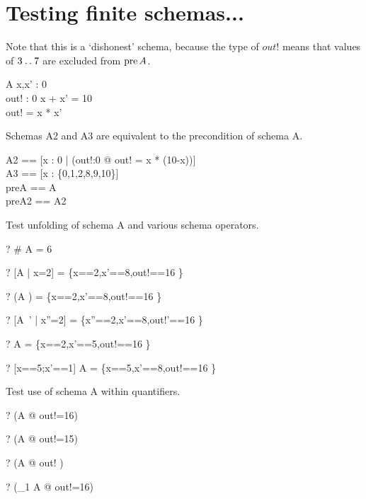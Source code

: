\documentclass{article}
\begin{document}
\section{Testing finite schemas...}

Note that this is a `dishonest' schema, because the type of $out!$
means that values of $3 \mathbin{\mathstrut{\ldotp\ldotp}} 7$ are excluded from $\mathop{\mathstrut{\mbox{\textrm{pre}}}}\nolimits A$.
\begin{schema}{A}
  x,x' : 0  \\
  out! : 0 
\where
  x + x' = 10 \\
  out! = x * x'
\end{schema}

Schemas A2 and A3 are equivalent to the precondition of schema A.
\begin{zed}
  A2 == [x : 0  | (\exists out!:0  @ out! = x * (10-x))]
\\
  A3 == [x : \{0,1,2,8,9,10\}]
\\
  preA == \pre A
\\
  preA2 == \pre A2
\end{zed}

Test unfolding of schema A and various schema operators.
\begin{zed} \vdash? 
  \# A = 6
\end{zed}
\begin{zed} \vdash? 
  [A | x=2] = \{\lblot x==2,x'==8,out!==16 \rblot\}
\end{zed}
\begin{zed} \vdash? 
  (A \land [x:\{2\}]) = \{\lblot x==2,x'==8,out!==16 \rblot\}
\end{zed}
\begin{zed} \vdash? 
  [A~' | x''=2] = \{\lblot x''==2,x'==8,out!'==16 \rblot\}
\end{zed}
\begin{zed} \vdash? 
  A \semi [x : \{8\}; x'==5] = \{\lblot x==2,x'==5,out!==16 \rblot\}
\end{zed}
\begin{zed} \vdash? 
  [x==5;x'==1] \semi A  =  \{\lblot x==5,x'==8,out!==16 \rblot\}
\end{zed}

Test use of schema A within quantifiers.
\begin{zed} \vdash? (\exists A @ out!=16) \end{zed}
\begin{zed} \vdash? \lnot (\exists A @ out!=15) \end{zed}
\begin{zed} \vdash? (\forall A @ out! ) \end{zed}
\begin{zed} \vdash? (\exists_1 A @ out!=16) \end{zed}
\end{document}

